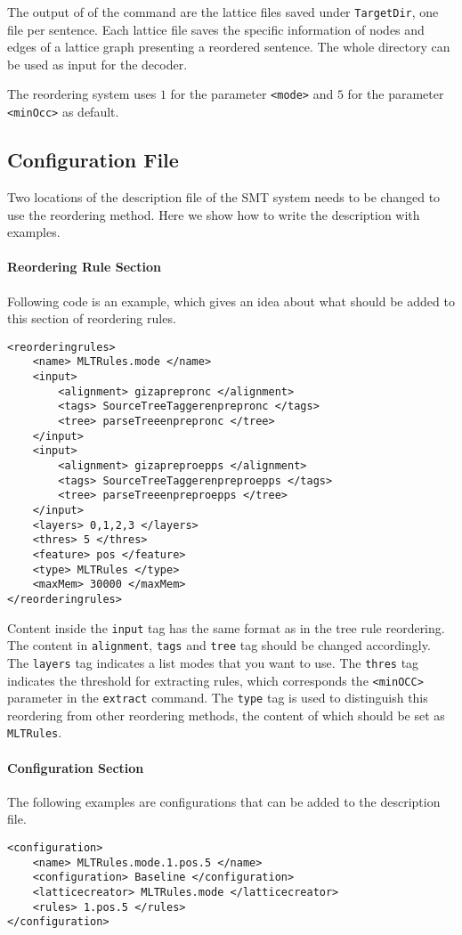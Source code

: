 The output of of the command are the lattice files saved under \verb|TargetDir|, one file per sentence. Each lattice file saves the specific information of nodes and edges of a lattice graph presenting a reordered sentence. The whole directory can be used as input for the decoder.

The reordering system uses $1$ for the parameter \verb|<mode>| and $5$ for the parameter \verb|<minOcc>| as default.

\subsection{Configuration File}

Two locations of the description file of the SMT system needs to be changed to use the reordering method. Here we show how to write the description with examples.

\paragraph{Reordering Rule Section}
Following code is an example, which gives an idea about what should be added to this section of reordering rules.

\begin{Verbatim}[frame=single]
<reorderingrules>
    <name> MLTRules.mode </name>
    <input>
        <alignment> gizaprepronc </alignment>
        <tags> SourceTreeTaggerenprepronc </tags>
        <tree> parseTreeenprepronc </tree>
    </input>
    <input>
        <alignment> gizapreproepps </alignment>
        <tags> SourceTreeTaggerenpreproepps </tags>
        <tree> parseTreeenpreproepps </tree>
    </input>
    <layers> 0,1,2,3 </layers>
    <thres> 5 </thres>
    <feature> pos </feature>
    <type> MLTRules </type>
    <maxMem> 30000 </maxMem>
</reorderingrules>
\end{Verbatim}
Content inside the \verb|input| tag has the same format as in the tree rule reordering. The content in \verb|alignment|, \verb|tags| and \verb|tree| tag should be changed accordingly. The \verb|layers| tag indicates a list modes that you want to use. The \verb|thres| tag indicates the threshold for extracting rules, which corresponds the \verb|<minOCC>| parameter in the \verb|extract| command. The \verb|type| tag is used to distinguish this reordering from other reordering methods, the content of which should be set as \verb|MLTRules|.

\paragraph{Configuration Section}
The following examples are configurations that can be added to the description file.
\begin{Verbatim}[frame=single]
<configuration>
    <name> MLTRules.mode.1.pos.5 </name>
    <configuration> Baseline </configuration>
    <latticecreator> MLTRules.mode </latticecreator>
    <rules> 1.pos.5 </rules>
</configuration>
\end{Verbatim}

